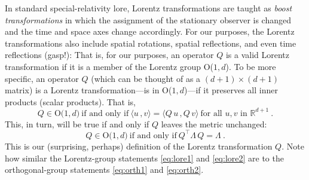 \documentclass{article}
\newcommand{\inner}[2]{\langle{#1}\,,{#2}\rangle}
\begin{document}
In standard special-relativity lore, Lorentz transformations are taught as \emph{boost transformations} in which the assignment of the stationary observer is changed and the time and space axes change accordingly.
For our purposes, the Lorentz transformations also include spatial rotations, spatial reflections, and even time reflections (gasp!):
That is, for our purposes, an operator $Q$ is a valid Lorentz transformation if it is a member of the Lorentz group O($1,d$).
To be more specific, an operator $Q$ (which can be thought of as a $(d+1)\times(d+1)$ matrix) is a Lorentz transformation---is in O($1,d$)---if it preserves all inner products (scalar products). 
That is,
\begin{equation}
    Q \in \mbox{O($1,d$)} ~ \mbox{if and only if} ~ \inner{u}{v}=\inner{Q\,u}{Q\,v} ~ \mbox{for all $u,v$ in $\mathbb{R}^{d+1}$} ~ .\label{eq:lore1}
\end{equation}
This, in turn, will be true if and only if $Q$ leaves the metric unchanged:
\begin{equation}
    Q \in \mbox{O($1,d$)} ~ \mbox{if and only if} ~ Q^\top\Lambda\,Q=\Lambda ~ .\label{eq:lore2}
\end{equation}
This is our (surprising, perhaps) definition of the Lorentz transformation $Q$.
Note how similar the Lorentz-group statements \eqref{eq:lore1} and \eqref{eq:lore2} are to the orthogonal-group statements \eqref{eq:orth1} and \eqref{eq:orth2}.
\end{document}
